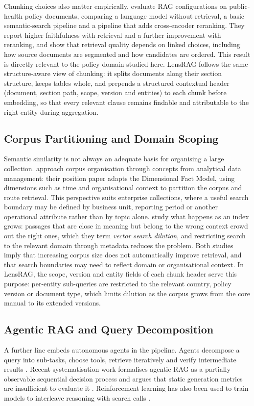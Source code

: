 \documentclass[11pt,letterpaper,oneside]{report}
\begin{document}
Chunking choices also matter empirically. \citet{maharjan2026chunking}
evaluate RAG configurations on public-health policy documents, comparing a
language model without retrieval, a basic semantic-search pipeline and a
pipeline that adds cross-encoder reranking. They report higher faithfulness
with retrieval and a further improvement with reranking, and show that
retrieval quality depends on linked choices, including how source documents
are segmented and how candidates are ordered. This result is directly
relevant to the policy domain studied here. LensRAG follows the same
structure-aware view of chunking: it splits documents along their section
structure, keeps tables whole, and prepends a structured contextual header
(document, section path, scope, version and entities) to each chunk before
embedding, so that every relevant clause remains findable and attributable to
the right entity during aggregation.

\subsection{Corpus Partitioning and Domain Scoping}
\label{sec:partitioning}
Semantic similarity is not always an adequate basis for organising a large
collection. \citet{maio2026olap} approach corpus organisation through
concepts from analytical data management: their position paper adapts the
Dimensional Fact Model, using dimensions such as time and organisational
context to partition the corpus and route retrieval. This perspective suits
enterprise collections, where a useful search boundary may be defined by
business unit, reporting period or another operational attribute rather than
by topic alone. \citet{subedi2026dilution} study what happens as an
index grows: passages that are close in meaning but belong to the wrong
context crowd out the right ones, which they term \emph{vector search
dilution}, and restricting search to the relevant domain through metadata
reduces the problem. Both studies imply that increasing corpus size does not automatically
improve retrieval, and that search boundaries may need to reflect domain or
organisational context. In LensRAG, the scope, version and entity fields of
each chunk header serve this purpose: per-entity sub-queries are restricted
to the relevant country, policy version or document type, which limits
dilution as the corpus grows from the core manual to its extended versions.

\subsection{Agentic RAG and Query Decomposition}
A further line embeds autonomous agents in the pipeline. Agents decompose a
query into sub-tasks, choose tools, retrieve iteratively and verify
intermediate results \citep{singh2025agenticrag}. Recent systematisation
work formalises agentic RAG as a partially observable sequential decision
process and argues that static generation metrics are insufficient to
evaluate it \citep{mishra2026sokagenticrag}. Reinforcement learning has also
been used to train models to interleave reasoning with search calls
\citep{jin2025searchr1}.
\end{document}
